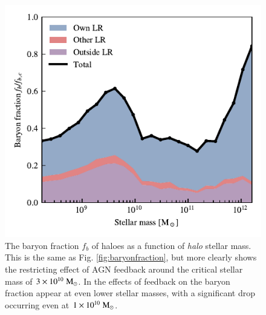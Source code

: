 \begin{figure}
	\centering
	\includegraphics{figures/s50j7kAHF/baryon_fraction_breakdown_stellar.pdf}
	\vspace{-0.7cm}
	\caption{The baryon fraction $f_b$ of haloes as a function of \emph{halo}
	stellar mass. This is the same as Fig. \ref{fig:baryonfraction}, but more
	clearly shows the restricting effect of AGN feedback around the critical
	stellar mass of $3\times10^{10}\;{\rm M}_{\odot}{}$. In \simba{} the effects of
	feedback on the baryon fraction appear at even lower stellar masses,
	with a significant drop occurring even at $1\times10^{10}\;{\rm M}_{\odot}{}$.}
	\label{fig:baryonfractionstellar}
\end{figure}